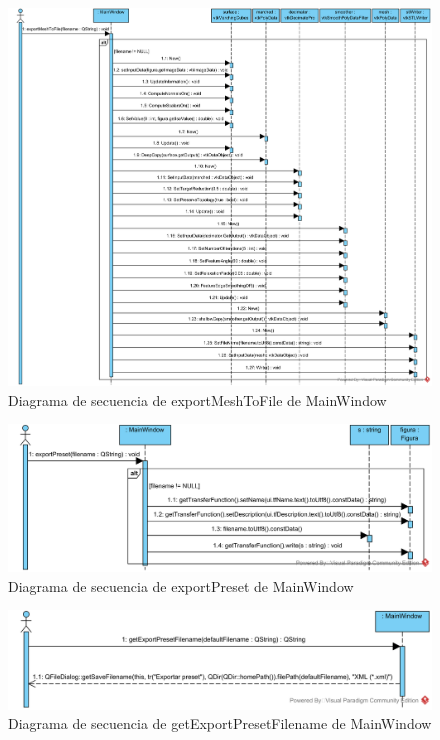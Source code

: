 \begin{figure}[H]
	\centering
	\includegraphics[width=12cm]{imagenes/diagramas/secuencia/MainWindow_ExportMeshToFile}
	\caption{Diagrama de secuencia de exportMeshToFile de MainWindow}
	\label{fig:diagrama_secuencia_mainWindow_exportMeshToFile}
\end{figure}

\begin{figure}[H]
	\centering
	\includegraphics[width=12cm]{imagenes/diagramas/secuencia/MainWindow_ExportPreset}
	\caption{Diagrama de secuencia de exportPreset de MainWindow}
	\label{fig:diagrama_secuencia_mainWindow_exportPreset}
\end{figure}

\begin{figure}[H]
	\centering
	\includegraphics[width=12cm]{imagenes/diagramas/secuencia/MainWindow_GetExportPresetFilename}
	\caption{Diagrama de secuencia de getExportPresetFilename de MainWindow}
	\label{fig:diagrama_secuencia_mainWindow_getExportPresetFilename}
\end{figure}

